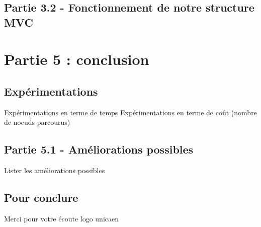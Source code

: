 \documentclass{beamer} %
\begin{document}
	\subsection{Partie 3.2 - Fonctionnement de notre structure MVC}
\begin{frame}[plain]
\end{frame}

\section{Partie 5 : conclusion}
	\subsection{Expérimentations}
\begin{frame}[plain]
Expérimentations en terme de temps
Expérimentations en terme de coût (nombre de noeuds parcourus)
\end{frame}
	\subsection{Partie 5.1 - Améliorations possibles}
\begin{frame}[plain]
Lister les améliorations possibles
\end{frame}

	\subsection{Pour conclure}
Merci pour votre écoute
logo unicaen
\end{document}
